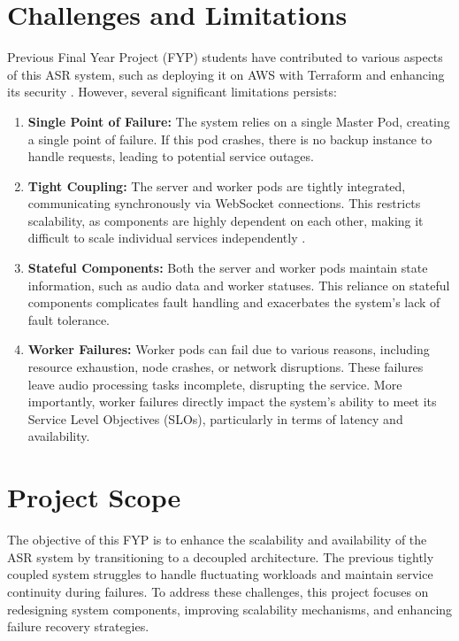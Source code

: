 \section{Challenges and Limitations}
Previous Final Year Project (FYP) students have contributed to various aspects of this ASR system, such as deploying it on AWS with Terraform \cite{song_yu, kai_shern} and enhancing its security \cite{putra}. However, several significant limitations persists:
\begin{enumerate}
    \item \textbf{Single Point of Failure: } The system relies on a single Master Pod, creating a single point of failure. If this pod crashes, there is no backup instance to handle requests, leading to potential service outages.
    \item \textbf{Tight Coupling: } The server and worker pods are tightly integrated, communicating synchronously via WebSocket connections. This restricts scalability, as components are highly dependent on each other, making it difficult to scale individual services independently \cite{tight_couple}.
    \item \textbf{Stateful Components: } Both the server and worker pods maintain state information, such as audio data and worker statuses. This reliance on stateful components complicates fault handling and exacerbates the system's lack of fault tolerance.
    \item \textbf{Worker Failures: } Worker pods can fail due to various reasons, including resource exhaustion, node crashes, or network disruptions. These failures leave audio processing tasks incomplete, disrupting the service. More importantly, worker failures directly impact the system’s ability to meet its Service Level Objectives (SLOs), particularly in terms of latency and availability.
    
\end{enumerate}

\section{Project Scope}
The objective of this FYP is to enhance the scalability and availability of the ASR system by transitioning to a decoupled architecture. The previous tightly coupled system struggles to handle fluctuating workloads and maintain service continuity during failures. To address these challenges, this project focuses on redesigning system components, improving scalability mechanisms, and enhancing failure recovery strategies.

